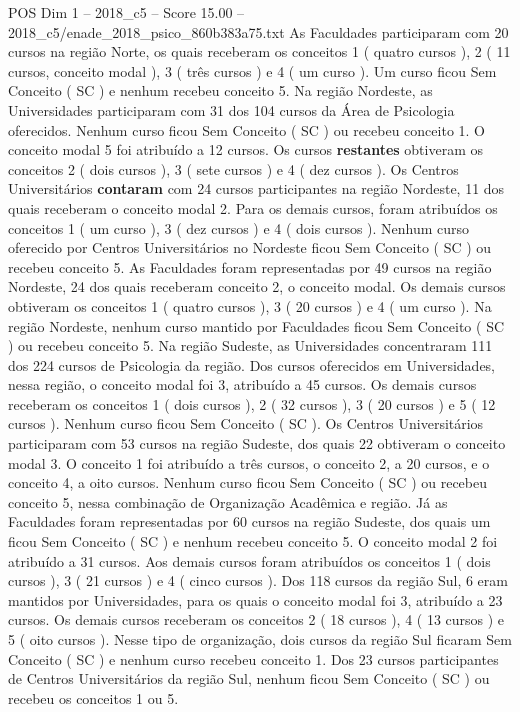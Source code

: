 \begin{textsample}{POS Dim 1 – 2018\_c5 – Score 15.00 – 2018\_c5/enade\_2018\_psico\_860b383a75.txt}
As Faculdades participaram com 20 cursos na região Norte, os quais receberam os conceitos 1 ( quatro cursos ), 2 ( 11 cursos, conceito modal ), 3 ( três cursos ) e 4 ( um curso ).
Um curso ficou Sem Conceito ( SC ) e nenhum recebeu conceito 5.
Na região Nordeste, as Universidades participaram com 31 dos 104 cursos da Área de Psicologia oferecidos.
Nenhum curso ficou Sem Conceito ( SC ) ou recebeu conceito 1.
O conceito modal 5 foi atribuído a 12 cursos.
Os cursos \textbf{restantes} obtiveram os conceitos 2 ( dois cursos ), 3 ( sete cursos ) e 4 ( dez cursos ).
Os Centros Universitários \textbf{contaram} com 24 cursos participantes na região Nordeste, 11 dos quais receberam o conceito modal 2.
Para os demais cursos, foram atribuídos os conceitos 1 ( um curso ), 3 ( dez cursos ) e 4 ( dois cursos ).
Nenhum curso oferecido por Centros Universitários no Nordeste ficou Sem Conceito ( SC ) ou recebeu conceito 5.
As Faculdades foram representadas por 49 cursos na região Nordeste, 24 dos quais receberam conceito 2, o conceito modal.
Os demais cursos obtiveram os conceitos 1 ( quatro cursos ), 3 ( 20 cursos ) e 4 ( um curso ).
Na região Nordeste, nenhum curso mantido por Faculdades ficou Sem Conceito ( SC ) ou recebeu conceito 5.
Na região Sudeste, as Universidades concentraram 111 dos 224 cursos de Psicologia da região.
Dos cursos oferecidos em Universidades, nessa região, o conceito modal foi 3, atribuído a 45 cursos.
Os demais cursos receberam os conceitos 1 ( dois cursos ), 2 ( 32 cursos ), 3 ( 20 cursos ) e 5 ( 12 cursos ).
Nenhum curso ficou Sem Conceito ( SC ).
Os Centros Universitários participaram com 53 cursos na região Sudeste, dos quais 22 obtiveram o conceito modal 3.
O conceito 1 foi atribuído a três cursos, o conceito 2, a 20 cursos, e o conceito 4, a oito cursos.
Nenhum curso ficou Sem Conceito ( SC ) ou recebeu conceito 5, nessa combinação de Organização Acadêmica e região.
Já as Faculdades foram representadas por 60 cursos na região Sudeste, dos quais um ficou Sem Conceito ( SC ) e nenhum recebeu conceito 5.
O conceito modal 2 foi atribuído a 31 cursos.
Aos demais cursos foram atribuídos os conceitos 1 ( dois cursos ), 3 ( 21 cursos ) e 4 ( cinco cursos ).
Dos 118 cursos da região Sul, 6 eram mantidos por Universidades, para os quais o conceito modal foi 3, atribuído a 23 cursos.
Os demais cursos receberam os conceitos 2 ( 18 cursos ), 4 ( 13 cursos ) e 5 ( oito cursos ).
Nesse tipo de organização, dois cursos da região Sul ficaram Sem Conceito ( SC ) e nenhum curso recebeu conceito 1.
Dos 23 cursos participantes de Centros Universitários da região Sul, nenhum ficou Sem Conceito ( SC ) ou recebeu os conceitos 1 ou 5.

\end{textsample}

